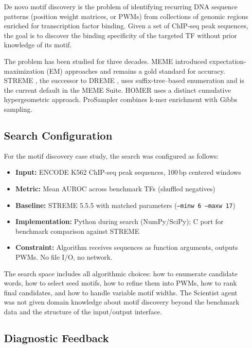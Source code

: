 \documentclass[11pt,a4paper]{article}
\begin{document}
De novo motif discovery is the problem of identifying recurring DNA sequence patterns (position weight matrices, or PWMs) from collections of genomic regions enriched for transcription factor binding. Given a set of ChIP-seq peak sequences, the goal is to discover the binding specificity of the targeted TF without prior knowledge of its motif.

The problem has been studied for three decades. MEME \citep{bailey1994meme} introduced expectation-maximization (EM) approaches and remains a gold standard for accuracy. STREME \citep{bailey2021streme}, the successor to DREME \citep{bailey2011dreme}, uses suffix-tree--based enumeration and is the current default in the MEME Suite. HOMER \citep{heinz2010homer} uses a distinct cumulative hypergeometric approach. ProSampler \citep{li2019prosampler} combines k-mer enrichment with Gibbs sampling.

\subsection{Search Configuration}

For the motif discovery case study, the search was configured as follows:

\begin{itemize}
    \item \textbf{Input:} ENCODE K562 ChIP-seq peak sequences, 100\,bp centered windows
    \item \textbf{Metric:} Mean AUROC across benchmark TFs (shuffled negatives)
    \item \textbf{Baseline:} STREME 5.5.5 with matched parameters (\texttt{--minw 6 --maxw 17})
    \item \textbf{Implementation:} Python during search (NumPy/SciPy); C port for benchmark comparison against STREME
    \item \textbf{Constraint:} Algorithm receives sequences as function arguments, outputs PWMs. No file I/O, no network.
\end{itemize}

The search space includes all algorithmic choices: how to enumerate candidate words, how to select seed motifs, how to refine them into PWMs, how to rank final candidates, and how to handle variable motif widths. The Scientist agent was not given domain knowledge about motif discovery beyond the benchmark data and the structure of the input/output interface.

\subsection{Diagnostic Feedback}
\end{document}

